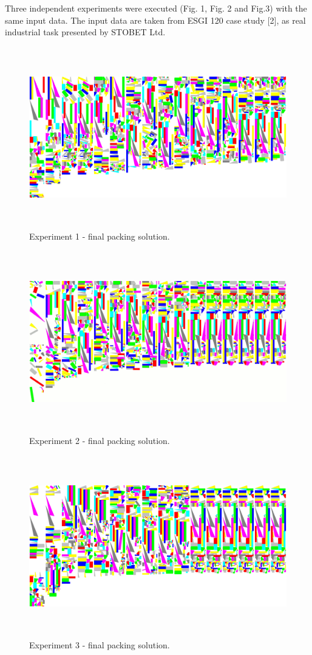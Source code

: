 \documentclass{llncs}
\begin{document}
\FloatBarrier
%
Three independent experiments were executed (Fig. 1, Fig. 2 and Fig.3) with the same input data. The input data are taken from ESGI 120 case study [2], as real industrial task presented by STOBET Ltd. 
%
\begin{figure}
	\centering
	\includegraphics[width=12.62cm,height=7.88cm]{fig01.png}
	\caption{Experiment 1 - final packing solution.}
	\label{fig:Graph}
\end{figure}
%
\begin{figure}
	\centering
	\includegraphics[width=12.62cm,height=7.88cm]{fig02.png}
	\caption{Experiment 2 - final packing solution.}
	\label{fig:Graph}
\end{figure}
%
\begin{figure}
	\centering
	\includegraphics[width=12.62cm,height=7.88cm]{fig03.png}
	\caption{Experiment 3 - final packing solution.}
	\label{fig:Graph}
\end{figure}
\FloatBarrier
\end{document}
